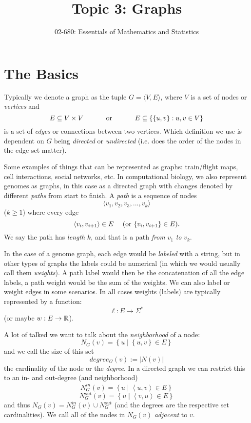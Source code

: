 


\title{Topic 3: Graphs}
\author{02-680: Essentials of Mathematics and Statistics}


\maketitle

\section{The Basics}
Typically we denote a graph as the tuple $G=\langle V, E\rangle$, 
where $V$ is a set of nodes or \emph{vertices} and 
\[E\subseteq V\times V \textnormal{\hspace{3em} or \hspace{3em}} E\subseteq \left\{\left\{u,v\right\} : u,v \in V\right\}\] 
is a set of \emph{edges} or connections between two vertices.
Which definition we use is dependent on $G$ being \emph{directed} or \emph{undirected} (i.e. does the order of the nodes in the edge set matter).  

Some examples of things that can be represented as graphs: train/flight maps, cell interactions, social networks, etc. 
In computational biology, we also represent genomes as graphs, in this case as a directed graph with changes denoted by different \emph{paths} from start to finish. 
A \textit{path} is a sequence of nodes \[\langle v_1, v_2, v_3,...,v_k \rangle\] ($k\ge 1$) where every edge \[\langle v_{i}, v_{i+1}\rangle \in E\textnormal{\hspace{1em} (or  }\{ v_{i}, v_{i+1}\} \in E\textnormal{).}\]
We say the path has \emph{length} $k$, and that is a path \textit{from} $v_1$ \textit{to} $v_k$.

In the case of a genome graph, each edge would be \emph{labeled} with a string, but in other types of graphs the labels could be numerical 
(in which we would usually call them \textit{weights}).
A path label would then be the concatenation of all the edge labels, a path weight would be the sum of the weights. 
We can also label or weight edges in some scenarios. 
In all cases weights (labels) are typically represented by a function:
\[\ell: E \rightarrow \Sigma^* \]
(or maybe $w: E \rightarrow \operatorname{\mathbb{R}}$).

A lot of talked we want to talk about the \emph{neighborhood} of a node: 
\[N_G(v) = \left\{ u \mid \left\{u,v\right\} \in E\right\}\]
and we call the size of this set \[degree_G(v) := \left|N(v)\right|\] the cardinality of the node or the \emph{degree}. 
In a directed graph we can restrict this to an in- and out-degree (and neighborhood)
\[N^{in}_G(v) = \left\{ u \mid \left\langle u,v\right\rangle \in E\right\}\]
\[N^{out}_G(v) = \left\{ u \mid \left\langle v,u\right\rangle \in E\right\}\]
and thus $N_G(v) = N^{in}_G(v) \cup N^{out}_G$ (and the degrees are the respective set cardinalities). 
We call all of the nodes in $N_G(v)$ \emph{adjacent} to $v$. 

